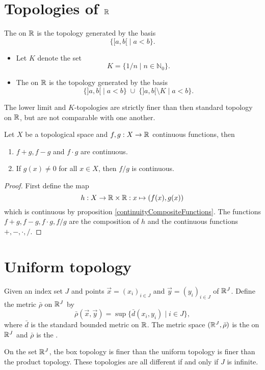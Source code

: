 \section{Topologies of $\mathbb{R}$}
\begin{definition}
The  on $\mathbb{R}$ is the topology generated by the basis
\[ \{ [a,b[ \;|\; a< b \}. \]
\end{definition}
\begin{definition}
\begin{itemize}
\item Let $K$ denote the set
\[ K = \{1/n \;|\; n\in \mathbb{N}_0\}. \]
\item The  on $\mathbb{R}$ is the topology generated by the basis
\[ \{ ]a,b[ \;|\; a< b \}\;\cup\;\{ ]a,b[\setminus K \;|\; a< b \}. \]
\end{itemize}
\end{definition}
\begin{lemma}
The lower limit and $K$-topologies are strictly finer than then standard topology on $\mathbb{R}$, but are not comparable with one another.
\end{lemma}
\begin{proposition}
Let $X$ be a topological space and $f,g:X\to \mathbb{R}$ continuous functions, then
\begin{enumerate}
\item $f+g, f-g$ and $f\cdot g$ are continuous.
\item If $g(x)\neq 0$ for all $x\in X$, then $f/g$ is continuous.
\end{enumerate}
\end{proposition}
\begin{proof}
First define the map
\[ h:X\to \mathbb{R}\times\mathbb{R}: x\mapsto (f(x),g(x)) \]
which is continuous by proposition \ref{continuityCompositeFunctions}. The functions $f+g,f-g,f\cdot g, f/g$ are the composition of $h$ and the continuous functions $+,-,\cdot,/$.
\end{proof}

\section{Uniform topology}
\begin{definition}
Given an index set $J$ and points $\vec{x}=(x_i)_{i\in J}$ and $\vec{y}=(y_i)_{i\in J}$ of $\mathbb{R}^J$. Define the metric $\bar{\rho}$ on $\mathbb{R}^J$ by
\[ \bar{\rho}(\vec{x}, \vec{y}) = \sup\{\bar{d}(x_i,y_i)\;|\; i\in J\}, \]
where $\bar{d}$ is the standard bounded metric on $\mathbb{R}$. The metric space $(\mathbb{R}^J, \bar{\rho})$ is the  on $\mathbb{R}^J$ and $\bar{\rho}$ is the .
\end{definition}
\begin{proposition}
On the set $\mathbb{R}^J$, the box topology is finer than the uniform topology is finer than the product topology. These topologies are all different \textup{if and only if} $J$ is infinite.
\end{proposition}






